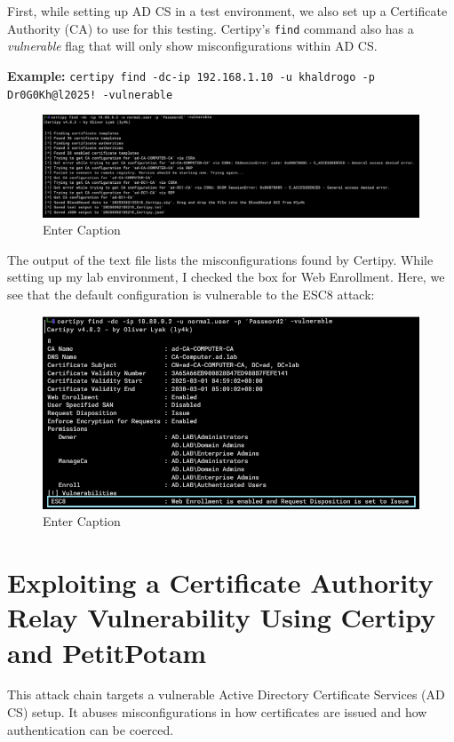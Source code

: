 First, while setting up AD CS in a test environment, we also set up a Certificate Authority (CA) to use for this testing. Certipy's \texttt{find} command also has a \textit{vulnerable} flag that will only show misconfigurations within AD CS.
\textbf{Example:} \verb|certipy find -dc-ip 192.168.1.10 -u khaldrogo -p Dr0G0Kh@l2025! -vulnerable|
\begin{figure}
    \centering
    \includegraphics[width=0.75\linewidth]{certipy3.png}
    \caption{Enter Caption}
    \label{fig:placeholder}
\end{figure}
The output of the text file lists the misconfigurations found by Certipy. While setting up my lab environment, I checked the box for Web Enrollment. Here, we see that the default configuration is vulnerable to the ESC8 attack:
\begin{figure}
    \centering
    \includegraphics[width=0.75\linewidth]{certipy4.png}
    \caption{Enter Caption}
    \label{fig:placeholder}
\end{figure}

\section{Exploiting a Certificate Authority Relay Vulnerability Using Certipy and PetitPotam}
This attack chain targets a vulnerable Active Directory Certificate Services (AD CS) setup. It abuses misconfigurations in how certificates are issued and how authentication can be coerced.

